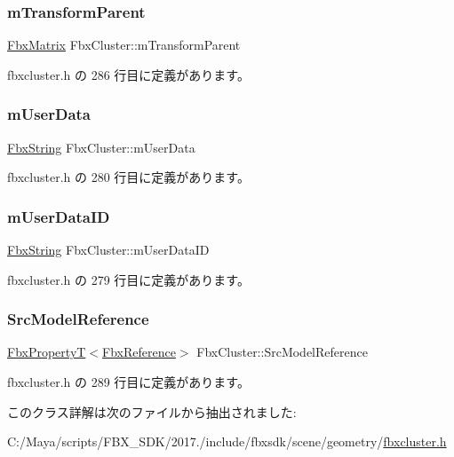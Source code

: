 \subsubsection{\texorpdfstring{m\+Transform\+Parent}{mTransformParent}}
{\footnotesize\ttfamily \hyperlink{class_fbx_matrix}{Fbx\+Matrix} Fbx\+Cluster\+::m\+Transform\+Parent\hspace{0.3cm}{\ttfamily [protected]}}



 fbxcluster.\+h の 286 行目に定義があります。

\mbox{\label{class_fbx_cluster_ab612a07b9a8cc381365289304d045d4c}} 
\subsubsection{\texorpdfstring{m\+User\+Data}{mUserData}}
{\footnotesize\ttfamily \hyperlink{class_fbx_string}{Fbx\+String} Fbx\+Cluster\+::m\+User\+Data\hspace{0.3cm}{\ttfamily [protected]}}



 fbxcluster.\+h の 280 行目に定義があります。

\mbox{\label{class_fbx_cluster_a2124739508768e40c733bd784516a6d9}} 
\subsubsection{\texorpdfstring{m\+User\+Data\+ID}{mUserDataID}}
{\footnotesize\ttfamily \hyperlink{class_fbx_string}{Fbx\+String} Fbx\+Cluster\+::m\+User\+Data\+ID\hspace{0.3cm}{\ttfamily [protected]}}



 fbxcluster.\+h の 279 行目に定義があります。

\mbox{\label{class_fbx_cluster_a7d34c8c9e6e527382c2bf2530a9df609}} 
\subsubsection{\texorpdfstring{Src\+Model\+Reference}{SrcModelReference}}
{\footnotesize\ttfamily \hyperlink{class_fbx_property_t}{Fbx\+PropertyT}$<$\hyperlink{fbxtypes_8h_a44df6a2eec915cf27cd481e5c5e48a24}{Fbx\+Reference}$>$ Fbx\+Cluster\+::\+Src\+Model\+Reference\hspace{0.3cm}{\ttfamily [protected]}}



 fbxcluster.\+h の 289 行目に定義があります。



このクラス詳解は次のファイルから抽出されました\+:\begin{DoxyCompactItemize}
\item 
C\+:/\+Maya/scripts/\+F\+B\+X\+\_\+\+S\+D\+K/2017./include/fbxsdk/scene/geometry/\hyperlink{fbxcluster_8h}{fbxcluster.\+h}\end{DoxyCompactItemize}
